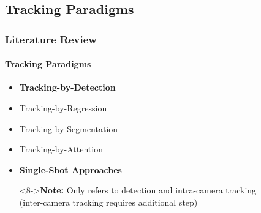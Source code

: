 \subsection{Tracking Paradigms}
\begin{frame}
    \frametitle{Literature Review}
    \framesubtitle{Tracking Paradigms}

    \begin{itemize}
        \item <1->\textbf{Tracking-by-Detection}
              \vspace{5pt}
        \item <2->Tracking-by-Regression
              \vspace{5pt}
        \item <3->Tracking-by-Segmentation
              \vspace{5pt}
        \item <4->Tracking-by-Attention
              \vspace{5pt}
        \item <5->\textbf{Single-Shot Approaches}
              \vspace{10pt}
        \item[]<8->\textbf{Note:} Only refers to detection and intra-camera tracking\\(inter-camera tracking requires additional step)
    \end{itemize}
\end{frame}

